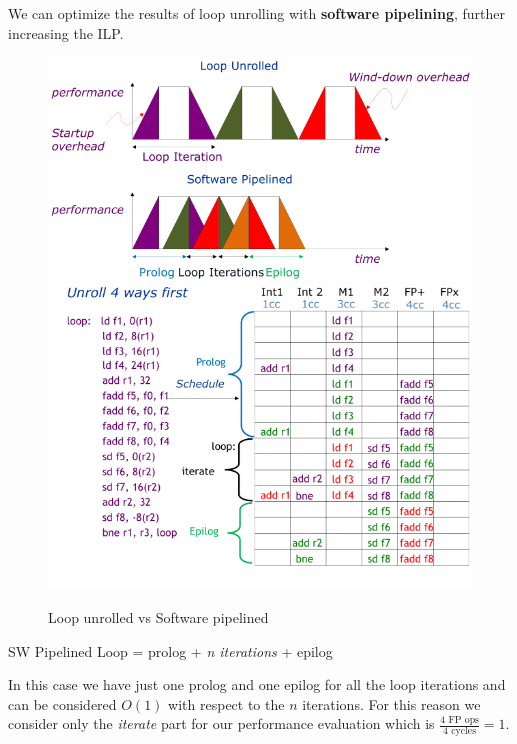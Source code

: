 We can optimize the results of loop unrolling with \textbf{software pipelining}, further increasing the ILP\@.
\begin{figure}[h]
    \centering
    \includegraphics[scale = 0.4]{images/loop-unrolled-vs-software-pipelined-1}
    \includegraphics[scale = 0.4]{images/loop-unrolled-vs-software-pipelined-2}
    \caption{Loop unrolled vs Software pipelined}
    \label{fig:loop-unrolled-vs-sw-pipelined}
\end{figure}

\begin{center}
    SW Pipelined Loop = prolog + \textit{n iterations} + epilog
\end{center}

In this case we have just one prolog and one epilog for all the loop iterations and can be considered $O(1)$ with
respect to the $n$ iterations.
For this reason we consider only the \textit{iterate} part for our performance evaluation which is \(\frac{4\text{ FP
ops}}{4\text{ cycles}} = 1\).

